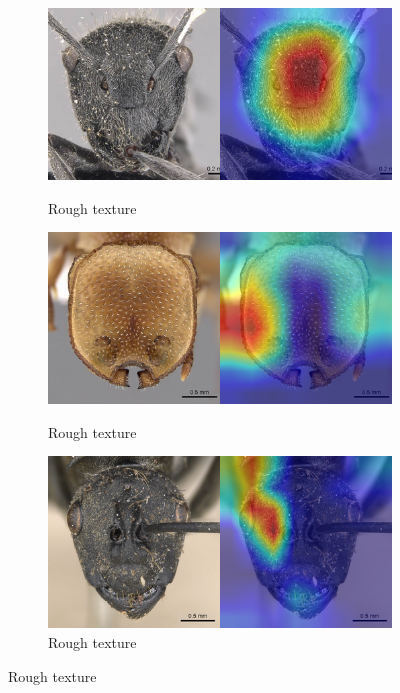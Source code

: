 \documentclass{aci}
\numberwithin{equation}{section}
\begin{document}
\begin{figure}
\begin{subfigure}{\subwidth}
        \label{fig:correct_ideal_842}
    \end{subfigure}
    \begin{subfigure}{\subwidth}
        \caption*{Rough texture}
        \includegraphics[width=1\linewidth]{thesis_assets/gradcam/correct_ideal/1091.png}
        \label{fig:correct_ideal_1091}
    \end{subfigure}
    \begin{subfigure}{\subwidth}
        \caption*{Rough texture}
        \includegraphics[width=1\linewidth]{thesis_assets/gradcam/correct_nonideal/346.png}
        \label{fig:correct_nonideal_346}
    \end{subfigure}
    \begin{subfigure}{\subwidth}
        \caption*{Rough texture}
        \includegraphics[width=1\linewidth]{thesis_assets/gradcam/correct_nonideal/1554.png}

\end{subfigure}
\end{figure}
\end{document}
